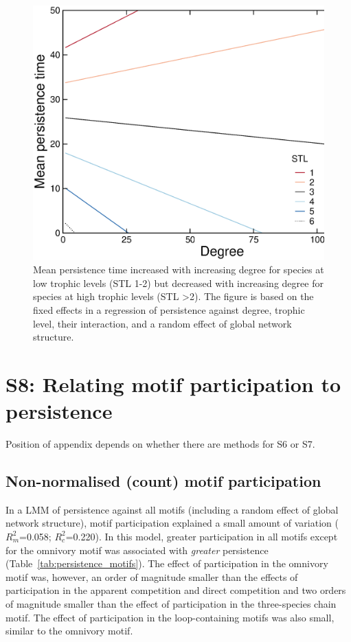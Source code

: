 \documentclass[12pt]{article}
\begin{document}
\begin{spacing}{2.0}
	    \begin{figure}[h!]
	        \centering
	        \includegraphics[width=\textwidth]{figures/roles/persistence_vs_degTL.eps}
	        \caption{Mean persistence time increased with increasing degree for species at low trophic levels (STL 1-2) but decreased with increasing degree for species at high trophic levels (STL \textgreater2). The figure is based on the fixed effects in a regression of persistence against degree, trophic level, their interaction, and a random effect of global network structure.}
	        \label{fig:persistence_degTL}
	    \end{figure}


\clearpage


\section*{S8: Relating motif participation to persistence}
	
	Position of appendix depends on whether there are methods for S6 or S7.


	\subsection*{Non-normalised (count) motif participation}

		In a LMM of persistence against all motifs (including a random effect of global network structure), motif participation explained a small amount of variation ($R^{2}_m$=0.058; $R^2_c$=0.220).
		In this model, greater participation in all motifs except for the omnivory motif was associated with \emph{greater} persistence (Table~\ref{tab:persistence_motifs}).
		The effect of participation in the omnivory motif was, however, an order of magnitude smaller than the effects of participation in the apparent competition and direct competition and two orders of magnitude smaller than the effect of participation in the three-species chain motif.
		The effect of participation in the loop-containing motifs was also small, similar to the omnivory motif.



\end{spacing}
\end{document}
